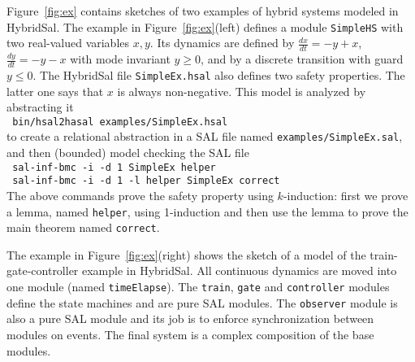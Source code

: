 \documentclass{llncs}
\begin{document}
Figure~\ref{fig:ex} contains sketches of two examples of 
hybrid systems modeled in HybridSal.
The example in Figure~\ref{fig:ex}(left) defines a module
{\tt{SimpleHS}} with two real-valued variables $x,y$.  Its 
dynamics are defined by %
$\frac{dx}{dt}=-y+x$, $\frac{dy}{dt}=-y-x$ with mode
invariant $y \geq 0$, and by a 
discrete transition with guard %
$y \leq 0$.
The HybridSal file {\tt{SimpleEx.hsal}} also defines 
two safety properties. The latter
one says that $x$ is always non-negative.
This model is analyzed by abstracting it 
\\ \indent
 {\tt{ bin/hsal2hasal examples/SimpleEx.hsal}}
\\ \noindent
to create a relational abstraction in 
a SAL file named {\tt{examples/SimpleEx.sal}},
and then (bounded) model checking the SAL file
\\ \indent
 {\tt{ sal-inf-bmc -i -d 1 SimpleEx helper}}
\\ \indent
 {\tt{ sal-inf-bmc -i -d 1 -l helper SimpleEx correct}}
\\ \noindent
The above commands prove the safety property using $k$-induction:
first we prove a lemma, named {\tt{helper}}, using 1-induction and then
use the lemma to prove the main theorem named {\tt{correct}}.

The example in Figure~\ref{fig:ex}(right) shows the sketch of
a model of the train-gate-controller example in HybridSal.
All continuous dynamics are moved into one module (named
{\tt{timeElapse}}).  The 
{\tt{train}},
{\tt{gate}} and
{\tt{controller}} modules define the state machines and are
pure SAL modules.
The {\tt{observer}} module is also a pure SAL module
and its job is to enforce synchronization between
modules on events.
The final system is a complex composition of the base modules.
\end{document}
